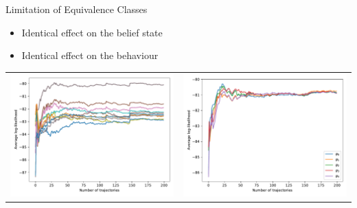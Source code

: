 \documentclass[
	english,%
	aspectratio=169,%
	color={accentcolor=3b},
	logo=true,%
	colorframetitle=false,%
	]{tudabeamer}
\begin{document}
\begin{frame}{Limitation of Equivalence Classes}
\begin{itemize}
	\item Identical effect on the belief state
	\item Identical effect on the behaviour
\end{itemize}
\centering
\begin{tabular}{cc}
	\includegraphics[height=0.6\textheight]{figures/llh_exactUpdate_81model}
	&
	\includegraphics[height=0.6\textheight]{figures/llh_particleFilter_sameclass}
\end{tabular}
\end{frame}
\end{document}
